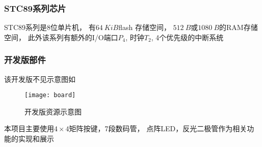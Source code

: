 \documentclass[../main.tex]{subfiles} %
\begin{document}
\subsubsection{STC89系列芯片}

  STC89系列是8位单片机，
  有$\SI{64}{KiB}$flash 存储空间，
  $\SI{512}{B}$或$\SI{1080}{B}$的RAM存储空间，
  此外该系列有额外的I/O端口$P_4$,
  时钟$T_2$,
  4个优先级的中断系统

\subsubsection{开发版部件}
  该开发版不见示意图如
  \begin{figure}[H]
    \centering
    \texttt{[image: board]}
    \caption{开发版资源示意图}
    \label{fig:board}
  \end{figure}
  本项目主要使用$4 \times 4$矩阵按键，7段数码管，
  点阵LED，反光二极管作为相关功能的实现和展示
\end{document}
